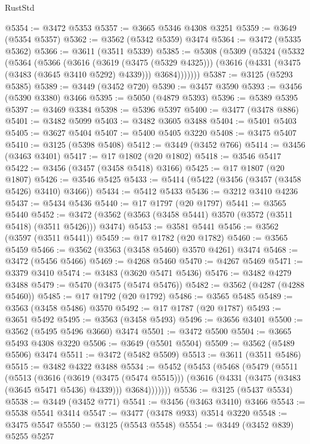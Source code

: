 \begin{lexlean}{RustStd}
\begin{coremodule}
@5354 := @3472 @5353
@5357 := @3665 @5346 @4308 @3251
@5359 := @3649 (@5354 @5357)
@5362 := @3562 (@5342 @5359) @3474
@5364 := @3472 (@5335 @5362)
@5366 := @3611 (@3511 @5339)
@5385 := @5308
    (@5309
      (@5324
        (@5332
          (@5364
            (@5366
              (@3616
                (@3619 (@3475 (@5329 @4325)))
                (@3616 (@4331 (@3475 (@3483 (@3645 @3410 @5292) @4339))) @3684)))))))
@5387 := @3125 (@5293 @5385)
@5389 := @3449 (@3452 @720)
@5390 := @3457 @3590
@5393 := @3456 (@5390 @3380) @3466
@5395 := @5050 (@4879 @5393)
@5396 := @5389 @5395
@5397 := @3469 @3384
@5398 := @5396 @5397
@5400 := @3477 (@3478 @886)
@5401 := @3482 @5099
@5403 := @3482 @3605 @3488
@5404 := @5401 @5403
@5405 := @3627 @5404
@5407 := @5400 @5405 @3220
@5408 := @3475 @5407
@5410 := @3125 (@5398 @5408)
@5412 := @3449 (@3452 @766)
@5414 := @3456 (@3463 @3401)
@5417 := @17 @1802 (@20 @1802)
@5418 := @3546 @5417
@5422 := @3456 (@3457 (@3458 @5418) @3166)
@5425 := @17 @1807 (@20 @1807)
@5426 := @3546 @5425
@5433 := @5414 (@5422 (@3456 (@3457 (@3458 @5426) @3410) @3466))
@5434 := @5412 @5433
@5436 := @3212 @3410 @4236
@5437 := @5434 @5436
@5440 := @17 @1797 (@20 @1797)
@5441 := @3565 @5440
@5452 := @3472 (@3562 (@3563 (@3458 @5441) @3570 (@3572 (@3511 @5418) (@3511 @5426))) @3474)
@5453 := @3581 @5441
@5456 := @3562 (@3597 (@3511 @5441))
@5459 := @17 @1782 (@20 @1782)
@5460 := @3565 @5459
@5466 := @3562 (@3563 (@3458 @5460) @3570 @4261) @3474
@5468 := @3472 (@5456 @5466)
@5469 := @4268 @5460
@5470 := @4267 @5469
@5471 := @3379 @3410
@5474 := @3483 (@3620 @5471 @5436)
@5476 := @3482 @4279 @3488
@5479 := @5470 (@3475 (@5474 @5476))
@5482 := @3562 (@4287 (@4288 @5460))
@5485 := @17 @1792 (@20 @1792)
@5486 := @3565 @5485
@5489 := @3563 (@3458 @5486) @3570
@5492 := @17 @1787 (@20 @1787)
@5493 := @3651 @5492
@5495 := @3563 (@3458 @5493)
@5496 := @3656 @3401
@5500 := @3562 (@5495 @5496 @3660) @3474
@5501 := @3472 @5500
@5504 := @3665 @5493 @4308 @3220
@5506 := @3649 (@5501 @5504)
@5509 := @3562 (@5489 @5506) @3474
@5511 := @3472 (@5482 @5509)
@5513 := @3611 (@3511 @5486)
@5515 := @3482 @4322 @3488
@5534 := @5452
    (@5453
      (@5468
        (@5479
          (@5511
            (@5513
              (@3616
                (@3619 (@3475 (@5474 @5515)))
                (@3616 (@4331 (@3475 (@3483 (@3645 @5471 @5436) @4339))) @3684)))))))
@5536 := @3125 (@5437 @5534)
@5538 := @3449 (@3452 @771)
@5541 := @3456 (@3463 @3410) @3466
@5543 := @5538 @5541 @3414
@5547 := @3477 (@3478 @933) @3514 @3220
@5548 := @3475 @5547
@5550 := @3125 (@5543 @5548)
@5554 := @3449 (@3452 @839) @5255 @5257

\end{coremodule}
\end{lexlean}

